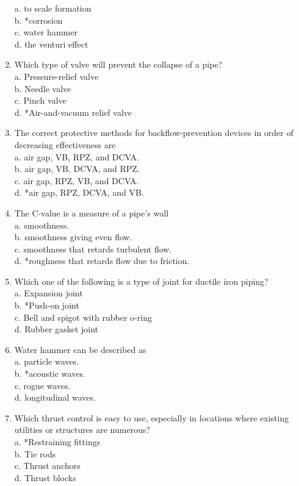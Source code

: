 \begin{enumerate}[1.]
a. to scale formation\\

b. *corrosion\\

c. water hammer\\

d. the venturi effect\\

\item Which type of valve will prevent the collapse of a pipe?\\
a. Pressure-relief valve\\
b. Needle valve\\
c. Pinch valve\\
d. *Air-and-vacuum relief valve

  \item The correct protective methods for backflow-prevention devices in order of decreasing effectiveness are\\
a. air gap, VB, RPZ, and DCVA.\\
b. air gap, VB, DCVA, and RPZ.\\
c. air gap, RPZ, VB, and DCVA.\\
d. *air gap, RPZ, DCVA, and VB.


  \item The C-value is a measure of a pipe's wall\\
a. smoothness.\\
b. smoothness giving even flow.\\
c. smoothness that retards turbulent flow.\\
d. *roughness that retards flow due to friction.

  \item Which one of the following is a type of joint for ductile iron piping?\\
a. Expansion joint\\
b. *Push-on joint\\
c. Bell and spigot with rubber o-ring\\
d. Rubber gasket joint

  \item Water hammer can be described as\\
a. particle waves.\\
b. *acoustic waves.\\
c. rogue waves.\\
d. longitudinal waves.

  \item Which thrust control is easy to use, especially in locations where existing utilities or structures are numerous?\\
a. *Restraining fittings\\
b. Tie rods\\
c. Thrust anchors\\
d. Thrust blocks


\end{enumerate}

